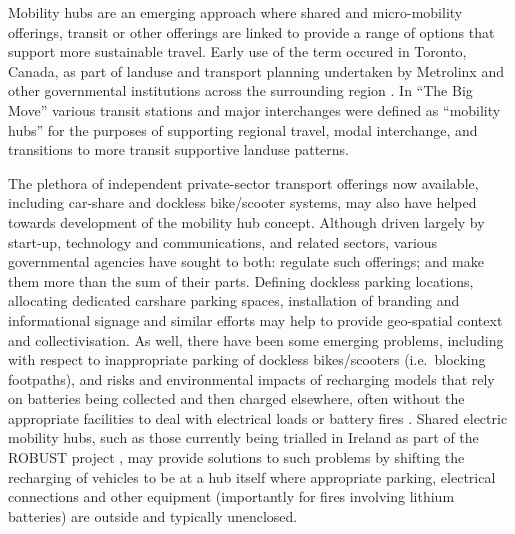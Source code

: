 \documentclass[preprint, 3p,
authoryear]{elsarticle} %
\begin{document}
Mobility hubs are an emerging approach where shared and micro-mobility
offerings, transit or other offerings are linked to provide a range of
options that support more sustainable travel. Early use of the term
occured in Toronto, Canada, as part of landuse and transport planning
undertaken by Metrolinx and other governmental institutions across the
surrounding region \citep{Salsberg:2010aa, Engel-Yan:2012aa}. In ``The
Big Move'' \citep{Metrolinx:2008aa} various transit stations and major
interchanges were defined as ``mobility hubs'' for the purposes of
supporting regional travel, modal interchange, and transitions to more
transit supportive landuse patterns.

The plethora of independent private-sector transport offerings now
available, including car-share and dockless bike/scooter systems, may
also have helped towards development of the mobility hub concept.
Although driven largely by start-up, technology and communications, and
related sectors, various governmental agencies have sought to both:
regulate such offerings; and make them more than the sum of their parts.
Defining dockless parking locations, allocating dedicated carshare
parking spaces, installation of branding and informational signage and
similar efforts may help to provide geo-spatial context and
collectivisation. As well, there have been some emerging problems,
including with respect to inappropriate parking of dockless
bikes/scooters (i.e.~blocking footpaths), and risks and environmental
impacts of recharging models that rely on batteries being collected and
then charged elsewhere, often without the appropriate facilities to deal
with electrical loads or battery fires
\citep{Meigs:2023aa, Zhang:2022aa}. Shared electric mobility hubs, such
as those currently being trialled in Ireland as part of the ROBUST
project \citep{ROBUST:2025aa}, may provide solutions to such problems by
shifting the recharging of vehicles to be at a hub itself where
appropriate parking, electrical connections and other equipment
(importantly for fires involving lithium batteries) are outside and
typically unenclosed.
\end{document}
